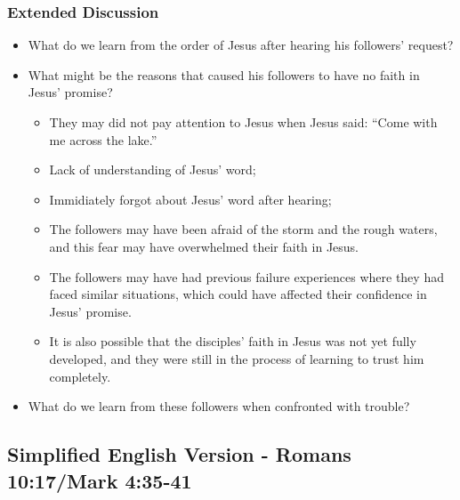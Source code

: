 \subsubsection{Extended Discussion}
\begin{itemize}
\item What do we learn from the order of Jesus after hearing his followers' request?
\item What might be the reasons that caused his followers to have no faith in Jesus' promise?
\begin{itemize}
\item They may did not pay attention to Jesus when Jesus said: “Come with me across the lake.” 
\item Lack of understanding of Jesus' word;
\item Immidiately forgot about Jesus' word after hearing;
\item The followers may have been afraid of the storm and the rough waters, and this fear may have overwhelmed their faith in Jesus.
\item The followers may have had previous failure experiences where they had faced similar situations, which could have affected their confidence in Jesus' promise.
\item It is also possible that the disciples' faith in Jesus was not yet fully developed, and they were still in the process of learning to trust him completely.
\end{itemize}
\item What do we learn from these followers when confronted with trouble?
\end{itemize}

















\newpage
\subsection{Simplified English Version - Romans 10:17/Mark 4:35-41}

